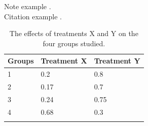 \documentclass[fontsize=11pt, %
                             paper=a4, %
                             oneside, %
                             captions=tableheading,
                             index=totoc,
                             hyperref]{labbook}
\begin{document}
\title{}

\author{
    \\ \\ %
    Master of Science %
}
\date{} %
\maketitle %
\printindex
\tableofcontents %
\newpage %
\pagestyle{scrheadings} %






\lipsum[1]



\lipsum[2]

Note example .\\

Citation example \cite{EPR}.



\lipsum[3]

\begin{table}
\label{tab:treatments_xy}
\begin{tabular}{l l l}
\toprule
\textbf{Groups} & \textbf{Treatment X} & \textbf{Treatment Y} \\
\toprule
1 & 0.2 & 0.8\\
2 & 0.17 & 0.7\\
3 & 0.24 & 0.75\\
4 & 0.68 & 0.3\\
\bottomrule\\
\end{tabular}
\caption{The effects of treatments X and Y on the four groups studied.}
\end{table}
\end{document}
